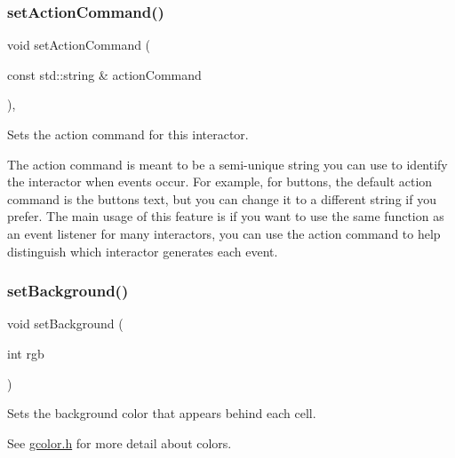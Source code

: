 \mbox{\label{classGInteractor_a4b5843fe3030e038a1ba54cc03389bcf}} 
\subsubsection{\texorpdfstring{set\+Action\+Command()}{setActionCommand()}}
{\footnotesize\ttfamily void set\+Action\+Command (\begin{DoxyParamCaption}\item[{const std\+::string \&}]{action\+Command }\end{DoxyParamCaption})\hspace{0.3cm}{\ttfamily [virtual]}, {\ttfamily [inherited]}}



Sets the action command for this interactor. 

The action command is meant to be a semi-\/unique string you can use to identify the interactor when events occur. For example, for buttons, the default action command is the button\textquotesingle{}s text, but you can change it to a different string if you prefer. The main usage of this feature is if you want to use the same function as an event listener for many interactors, you can use the action command to help distinguish which interactor generates each event. \mbox{\label{classGTable_ac45b8a90f31752385a98a034a58547c7}} 
\subsubsection{\texorpdfstring{set\+Background()}{setBackground()}\hspace{0.1cm}{\footnotesize\ttfamily [1/2]}}
{\footnotesize\ttfamily void set\+Background (\begin{DoxyParamCaption}\item[{int}]{rgb }\end{DoxyParamCaption})\hspace{0.3cm}{\ttfamily [virtual]}}



Sets the background color that appears behind each cell. 

See \mbox{\hyperlink{gcolor_8h_source}{gcolor.\+h}} for more detail about colors. 

